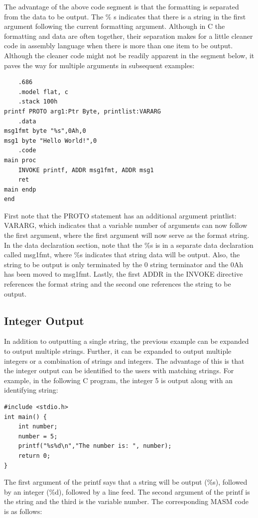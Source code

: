 \documentclass[10pt]{book}
\begin{document}
The advantage of the above code segment is that the formatting is separated from the data to be output. The $\%$ s indicates that there is a string in the first argument following the current formatting argument. Although in C the formatting and data are often together, their separation makes for a little cleaner code in assembly language when there is more than one item to be output. Although the cleaner code might not be readily apparent in the segment below, it paves the way for multiple arguments in subsequent examples:
\begin{verbatim}
    .686
    .model flat, c
    .stack 100h
printf PROTO arg1:Ptr Byte, printlist:VARARG
    .data
msg1fmt byte "%s",0Ah,0
msg1 byte "Hello World!",0
    .code
main proc
    INVOKE printf, ADDR msg1fmt, ADDR msg1
    ret
main endp
end
\end{verbatim}

First note that the PROTO statement has an additional argument printlist: VARARG, which indicates that a variable number of arguments can now follow the first argument, where the first argument will now serve as the format string. In the data declaration section, note that the \%s is in a separate data declaration called msg1fmt, where \%s indicates that string data will be output. Also, the string to be output is only terminated by the 0 string terminator and the 0Ah has been moved to msg1fmt. Lastly, the first ADDR in the INVOKE directive references the format string and the second one references the string to be output.

\subsection{Integer Output}
In addition to outputting a single string, the previous example can be expanded to output multiple strings. Further, it can be expanded to output multiple integers or a combination of strings and integers. The advantage of this is that the integer output can be identified to the users with matching strings. For example, in the following C program, the integer 5 is output along with an identifying string:
\begin{verbatim}
#include <stdio.h>
int main() {
    int number;
    number = 5;
    printf("%s%d\n","The number is: ", number);
    return 0;
}
\end{verbatim}

The first argument of the printf says that a string will be output (\%s), followed by an integer (\%d), followed by a line feed. The second argument of the printf is the string and the third is the variable number. The corresponding MASM code is as follows:
\end{document}
